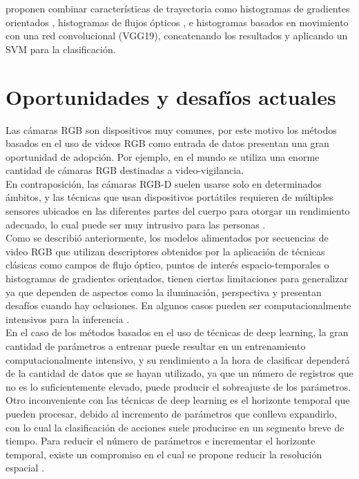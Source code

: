\citep{Peng2015} proponen combinar características de trayectoria como histogramas de gradientes orientados \citep{Dalal2005}, histogramas de flujos ópticos \citep{Chaudhry2009}, e histogramas basados en movimiento \citep{Wang2013} con una red convolucional (VGG19), concatenando los resultados y aplicando un SVM para la clasificación.

\section{Oportunidades y desafíos actuales}

Las cámaras RGB son dispositivos muy comunes, por este motivo los métodos basados en el uso de videos RGB como entrada de datos presentan una gran oportunidad de adopción. Por ejemplo, en el mundo se utiliza una enorme cantidad de cámaras RGB destinadas a video-vigilancia. \\ 

En contraposición, las cámaras RGB-D suelen usarse solo en determinados ámbitos, y las técnicas que usan dispositivos portátiles requieren de múltiples sensores ubicados en las diferentes partes del cuerpo para otorgar un rendimiento adecuado, lo cual puede ser muy intrusivo para las personas \citep{Yadav2021}. \\

Como se describió anteriormente, los modelos alimentados por secuencias de video RGB que utilizan descriptores obtenidos por la aplicación de técnicas clásicas como campos de flujo óptico, puntos de interés espacio-temporales o histogramas de gradientes orientados, tienen ciertas limitaciones para generalizar ya que dependen de aspectos como la iluminación, perspectiva y presentan desafíos cuando hay oclusiones. En algunos casos pueden ser computacionalmente intensivos para la inferencia  \citep{Zhang2018}. \\

En el caso de los métodos basados en el uso de técnicas de deep learning, la gran cantidad de parámetros a entrenar puede resultar en un entrenamiento computacionalmente intensivo, y su rendimiento a la hora de clasificar dependerá de la cantidad de datos que se hayan utilizado, ya que un número de registros que no es lo suficientemente elevado, puede producir el sobreajuste de los parámetros. \\

Otro inconveniente con las técnicas de deep learning es el horizonte temporal que pueden procesar, debido al incremento de parámetros que conlleva expandirlo, con lo cual la clasificación de acciones suele producirse en un segmento breve de tiempo. Para reducir el número de parámetros e incrementar el horizonte temporal, existe un compromiso en el cual se propone reducir la resolución espacial \citep{Asadi-Aghbolaghi2017}.
